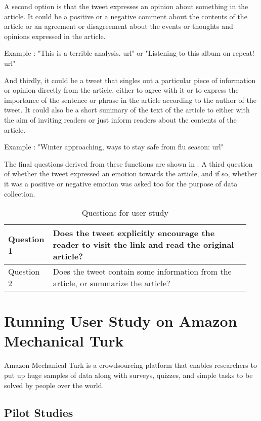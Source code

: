 A second option is that the tweet expresses an opinion about something in the article. It could be a positive or a negative comment about the contents of the article or an agreement or disagreement about the events or thoughts and opinions expressed in the article. 

Example : "This is a terrible analysis. {url}" or "Listening to this album on repeat! {url}"

And thirdly, it could be a tweet that singles out a particular piece of information or opinion directly from the article, either to agree with it or to express the importance of the sentence or phrase in the article according to the author of the tweet. It could also be a short summary of the text of the article to either with the aim of inviting readers or just inform readers about the contents of the article.

Example : "Winter approaching, ways to stay safe from flu season: {url}"

The final questions derived from these functions are shown in . A third question of whether the tweet expressed an emotion towards the article, and if so, whether it was a positive or negative emotion was asked too for the purpose of data collection. 

\begin{table}[!htbp]
\centering
\caption{Questions for user study}
\label{tab:mturkqs}
\begin{tabular}{|p{0.15\linewidth}|p{0.8\linewidth}|}
\hline
Question 1 & Does the tweet explicitly encourage the reader to visit the link and read the original article? \\ \hline
Question 2 & Does the tweet contain some information from the article, or summarize the article?             \\ \hline
\end{tabular}
\end{table} 

\section{Running User Study on Amazon Mechanical Turk}

Amazon Mechanical Turk is a crowdsourcing platform that enables researchers to put up huge samples of data along with surveys, quizzes, and simple tasks to be solved by people over the world.

\subsection{Pilot Studies}

